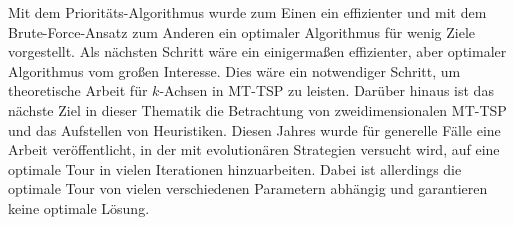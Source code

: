 \documentclass[german,version-2019-11]{uzl-thesis}
\begin{document}
Mit dem Prioritäts-Algorithmus wurde zum Einen ein effizienter und mit dem Brute-Force-Ansatz zum Anderen ein optimaler Algorithmus für wenig Ziele vorgestellt. Als nächsten Schritt wäre ein einigermaßen effizienter, aber optimaler Algorithmus vom großen Interesse. Dies wäre ein notwendiger Schritt, um theoretische Arbeit für $k$-Achsen in MT-TSP zu leisten. Darüber hinaus ist das nächste Ziel in dieser Thematik die Betrachtung von zweidimensionalen MT-TSP und das Aufstellen von Heuristiken. Diesen Jahres wurde für generelle Fälle eine Arbeit \cite{moraes} veröffentlicht, in der mit evolutionären Strategien versucht wird, auf eine optimale Tour in vielen Iterationen hinzuarbeiten. Dabei ist allerdings die optimale Tour von vielen verschiedenen Parametern abhängig und garantieren keine optimale Lösung. 
\end{document}
